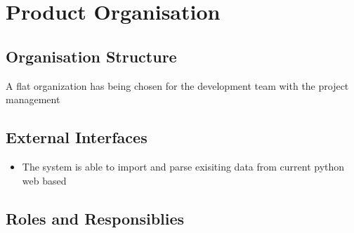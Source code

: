 
\chapter{Product Organisation} %

\label{Part6Chapter3} %



\section{Organisation Structure}
A flat organization has being chosen for the development team with the project management



\section{External Interfaces}

\begin{itemize}
	\item The system is able to import and parse exisiting data from current python web based 
\end{itemize}


\section{Roles and Responsiblies}


